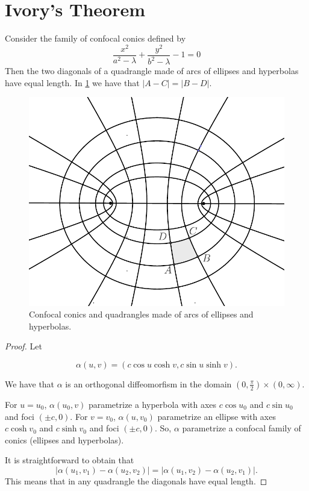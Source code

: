 \section{Ivory's Theorem}

\begin{theorem}\label{prop:ivory}
    Consider the family of confocal conics defined by
    \[\frac{x^2}{a^2-\lambda}+\frac{y^2}{b^2-\lambda}-1=0\]
    Then the two diagonals of a  quadrangle  made of arcs of ellipses and hyperbolas have equal length. In \cref{fig:ivory} we have that $|A-C|=|B-D|.$
\end{theorem}

\begin{figure}
\begin{center}
\includegraphics[scale=0.6]{chap_09/pics/pics_09_010_ivory.pdf}
\caption{ Confocal conics and quadrangles made of arcs of ellipses and hyperbolas.}
\label{fig:ivory}
\end{center}
\end{figure}

\begin{proof} Let 

\[\alpha(u,v)=(c\cos u\cosh v, c\sin u\sinh v).\]

We have that $\alpha$ is an orthogonal  diffeomorfism in the domain $(0,\frac{\pi}{2})\times (0,\infty)$.

For $u=u_0$, $\alpha(u_0,v)$ parametrize a  hyperbola with axes $c\cos u_0$ and $ c\sin u_0$ and foci $(\pm c,0)$.
For $v=v_0$, $\alpha(u ,v_0)$ parametrize an ellipse with axes $c\cosh{ v_0}$ and $c\sinh{ v_0}$ and foci $(\pm c,0)$. So, $\alpha$ parametrize a confocal family of conics (ellipses and hyperbolas).

It is straightforward to obtain that
\[ 
|\alpha(u_1,v_1)-\alpha(u_2,v_2)|=|\alpha(u_1,v_2)-\alpha(u_2,v_1)|.\]
This means that in any quadrangle the diagonals have equal length.
\end{proof}



